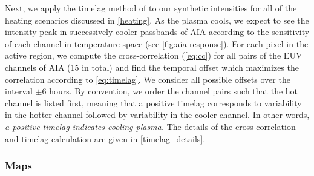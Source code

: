 Next, we apply the timelag method of \citet{viall_evidence_2012} to our synthetic intensities for all of the heating scenarios discussed in \autoref{heating}. As the plasma cools, we expect to see the intensity peak in successively cooler passbands of AIA according to the sensitivity of each channel in temperature space (see \autoref{fig:aia-response}). For each pixel in the active region, we compute the cross-correlation (\autoref{eq:cc}) for all pairs of the EUV channels of AIA (15 in total) and find the temporal offset which maximizes the correlation according to \autoref{eq:timelag}. We consider all possible offsets over the interval $\pm6$ hours. By convention, we order the channel pairs such that the hot channel is listed first, meaning that a positive timelag corresponds to variability in the hotter channel followed by variability in the cooler channel. In other words, \textit{a positive timelag indicates cooling plasma.} The details of the cross-correlation and timelag calculation are given in \autoref{timelag_details}.

\subsubsection{Maps}\label{timelag_maps}

